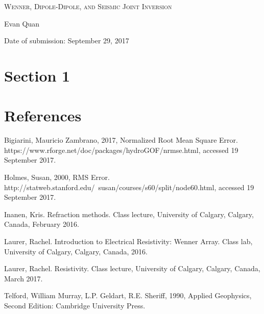 \documentclass[12p]{article}
\newenvironment{hangingpar}[1]
  {\begin{list}
          {}
          {\setlength{\itemindent}{-#1}%
           \setlength{\leftmargin}{#1}%
           \setlength{\itemsep}{0pt}%
           \setlength{\parsep}{\parskip}%
           \setlength{\topsep}{\parskip}%
           }
    \setlength{\parindent}{-#1}%
    \item[]
  }
  {\end{list}}
\theoremstyle{definition}
\begin{document}
\begin{titlepage}
    \begin{center}
        \vspace*{1cm}

        \textsc{\Large Wenner, Dipole-Dipole, and Seismic Joint Inversion}
        \vspace{0.3cm}

        \vspace{2cm}

        {Evan Quan}

        \vspace{2cm}
        Date of submission: September 29, 2017
    \end{center}
\end{titlepage}
\thispagestyle{fancy}
\setcounter{page}{0}
\tableofcontents
{}
\break
{}

\section{Section 1}


\section{References}
\begin{hangingpar}{2em}
  Bigiarini, Mauricio Zambrano, 2017, Normalized Root Mean Square Error.\\
  https://www.rforge.net/doc/packages/hydroGOF/nrmse.html, accessed 19 September 2017.

  Holmes, Susan, 2000, RMS Error.\\
  http://statweb.stanford.edu/~susan/courses/s60/split/node60.html, accessed 19 September 2017.

  Inanen, Kris. Refraction methods. Class lecture, University of Calgary, Calgary, Canada, February 2016.

  Laurer, Rachel. Introduction to Electrical Resistivity: Wenner Array. Class lab, University of Calgary, Calgary, Canada, 2016.

  Laurer, Rachel. Resistivity. Class lecture, University of Calgary, Calgary, Canada, March 2017.

  Telford, William Murray, L.P. Geldart, R.E. Sheriff, 1990, Applied Geophysics, Second Edition: Cambridge University Press.
\end{hangingpar}
\end{document}
